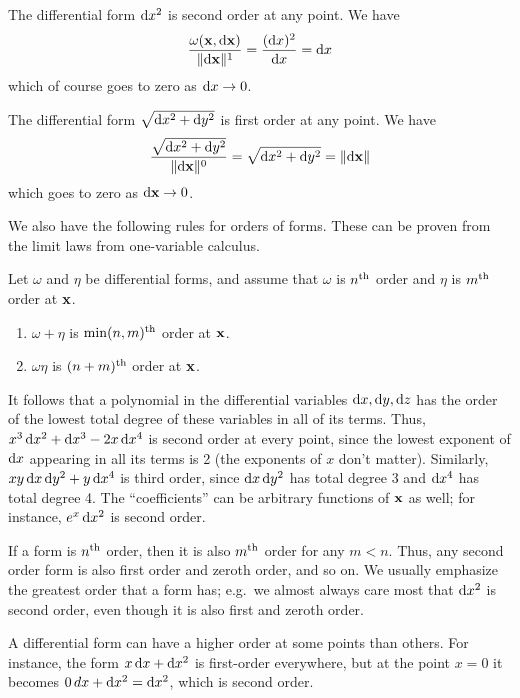 \documentclass[12pt]{amsart}
\begin{document}
\begin{eg}
  The differential form $\mathrm{d} x^2$ is second order at any point.
  We have
  \[ \frac{\omega(\mathbf{x},\mathrm{d} \mathbf{x})}{\Vert \mathrm{d} \mathbf{x} \Vert^1} = \frac{(\mathrm{d} x)^2}{\mathrm{d} x} = \mathrm{d} x \]
  which of course goes to zero as $\mathrm{d} x\to 0$.
\end{eg}

\begin{eg}
  The differential form $\sqrt{\mathrm{d} x^2+\mathrm{d} y^2}$ is first order at any point.
  We have
  \[ \frac{\sqrt{\mathrm{d} x^2+\mathrm{d} y^2}}{\Vert \mathrm{d} \mathbf{x} \Vert^0} =
  \sqrt{\mathrm{d} x^2+\mathrm{d} y^2} = \Vert \mathrm{d} \mathbf{x} \Vert
  \]
  which goes to zero as $\mathrm{d} \mathbf{x}\to 0$.
\end{eg}

We also have the following rules for orders of forms.
These can be proven from the limit laws from one-variable calculus.

\begin{thm}
  Let $\omega$ and $\eta$ be differential forms, and assume that $\omega$ is $n^{\mathrm{th}}$ order and $\eta$ is $m^{\mathrm{th}}$ order at $\mathbf{x}$.
  \begin{enumerate}
  \item $\omega+\eta$ is $\min(n,m)^{\mathrm{th}}$ order at $\mathbf{x}$.
  \item $\omega\eta$ is $(n+m)^{\mathrm{th}}$ order at $\mathbf{x}$.
  \end{enumerate}
\end{thm}

It follows that a polynomial in the differential variables $\mathrm{d} x,\mathrm{d} y,\mathrm{d} z$ has the order of the lowest total degree of these variables in all of its terms.
Thus, $x^3\, \mathrm{d} x^2 + \mathrm{d} x^3 - 2x \,\mathrm{d} x^4$ is second order at every point, since the lowest exponent of $\mathrm{d} x$ appearing in all its terms is 2 (the exponents of $x$ don't matter).
Similarly, $xy\,\mathrm{d} x\,\mathrm{d} y^2 + y\, \mathrm{d} x^4$ is third order, since $\mathrm{d} x\,\mathrm{d} y^2$ has total degree 3 and $\mathrm{d} x^4$ has total degree 4.
The ``coefficients'' can be arbitrary functions of $\mathbf{x}$ as well; for instance, $e^x \,\mathrm{d} x^2$ is second order.

\begin{rmk}
  If a form is $n^{\mathrm{th}}$ order, then it is also $m^{\mathrm{th}}$ order for any $m<n$.
  Thus, any second order form is also first order and zeroth order, and so on.
  We usually emphasize the greatest order that a form has; e.g.\ we almost always care most that $\mathrm{d} x^2$ is second order, even though it is also first and zeroth order.
\end{rmk}

\begin{eg}
  A differential form can have a higher order at some points than others.
  For instance, the form $x \,\mathrm{d} x + \mathrm{d} x^2$ is first-order everywhere, but at the point $x=0$ it becomes $0\, dx + \mathrm{d} x^2 = \mathrm{d} x^2$, which is second order.
\end{eg}
\end{document}
